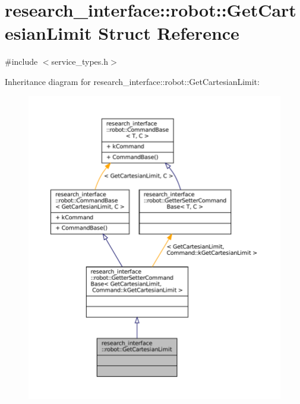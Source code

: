 \hypertarget{structresearch__interface_1_1robot_1_1GetCartesianLimit}{}\section{research\+\_\+interface\+:\+:robot\+:\+:Get\+Cartesian\+Limit Struct Reference}
\label{structresearch__interface_1_1robot_1_1GetCartesianLimit}


{\ttfamily \#include $<$service\+\_\+types.\+h$>$}



Inheritance diagram for research\+\_\+interface\+:\+:robot\+:\+:Get\+Cartesian\+Limit\+:
\nopagebreak
\begin{figure}[H]
\begin{center}
\leavevmode
\includegraphics[width=350pt]{structresearch__interface_1_1robot_1_1GetCartesianLimit__inherit__graph}
\end{center}
\end{figure}


